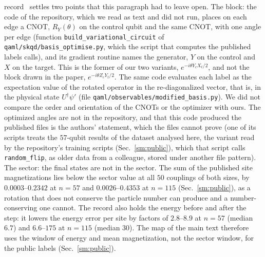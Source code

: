 \documentclass[aps,prx,onecolumn,10pt,nofootinbib,longbibliography,floatfix]{revtex4-2}
\theoremstyle{remark}
\begin{document}
record~\cite{jaderberg2026data} settles two points that this paragraph had to leave open. The block: the code
of the repository, which we read as text and did not run, places on each edge a CNOT, $R_Y(\theta)$ on the control
qubit and the same CNOT, with one angle per edge (function \texttt{build\_variational\_circuit} of
\texttt{qaml/skqd/basis\_optimise.py}, which the script that computes the published labels calls), and its gradient
routine names the generator, $Y$ on the control and $X$ on the target. This is the former of our two variants,
$e^{-i\theta Y_cX_t/2}$, and not the block drawn in the paper, $e^{-i\theta Z_cY_t/2}$. The same code evaluates each
label as the expectation value of the rotated operator in the re-diagonalized vector, that is, in the physical state
$U^\dagger\psi'$ (file \texttt{qaml/observables/modified\_basis.py}). We did not compare the order and orientation of
the CNOTs or the optimizer with ours. The optimized angles are not in the repository, and that this code produced the
published files is the authors' statement, which the files cannot prove (one of its scripts treats the $57$-qubit results of the dataset analysed here, the variant read by the repository's training scripts (Sec.~\ref{sm:public}), which that script calls \texttt{random\_flip}, as older data from a colleague, stored under another file pattern). The sector: the final states are not in the
sector. The sum of the published site magnetizations lies below the sector value at all $50$ couplings of both %
sizes, by $0.0003$--$0.2342$ at $n=57$ and $0.0026$--$0.4353$ at $n=115$ (Sec.~\ref{sm:public}), as a rotation that %
does not conserve the particle number can produce and a number-conserving one cannot. The record also holds the
energy before and after the step: it lowers the energy error per site by factors of $2.8$--$8.9$ at $n=57$ (median %
$6.7$) and $6.6$--$175$ at $n=115$ (median $30$). The map of the main text therefore uses the window of energy and %
mean magnetization, not the sector window, for the public labels (Sec.~\ref{sm:public}).
\end{document}
